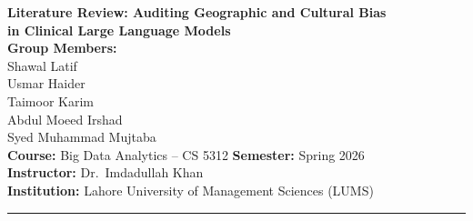 \documentclass[12pt,a4paper]{article}
\begin{document}
\begin{center}
{\LARGE \textbf{Literature Review: Auditing Geographic and Cultural Bias\\[0.4em]
in Clinical Large Language Models}}\\[1.8em]
{\large \textbf{Group Members:}}\\[0.6em]
Shawal Latif\\
Usmar Haider\\
Taimoor Karim\\
Abdul Moeed Irshad\\
Syed Muhammad Mujtaba\\[1.2em]
\textbf{Course:} Big Data Analytics -- CS 5312 \qquad
\textbf{Semester:} Spring 2026\\
\textbf{Instructor:} Dr.\ Imdadullah Khan\\
\textbf{Institution:} Lahore University of Management Sciences (LUMS)
\end{center}

\vspace{0.8em}\hrule\vspace{0.8em}

\begin{abstract}
This literature review surveys thirteen papers at the intersection of clinical artificial intelligence, algorithmic fairness, and large language model (LLM) evaluation, collectively motivating a systematic audit of geographic and cultural bias in clinical LLMs. The reviewed work is organised into four thematic categories: (1)~racial and sociodemographic bias in clinical AI systems; (2)~geographic and cultural bias in language models; (3)~clinical LLM evaluation frameworks and health equity benchmarks; and (4)~fairness methodologies, intersectionality, and perturbation-based auditing. The literature demonstrates that LLMs consistently produce disparate clinical recommendations driven by non-clinical identity cues---patient name, race, dialect, and geographic origin---even when the underlying medical presentation is held constant. Crucially, every reviewed clinical bias study operates within Global-North demographic categories; the Global North/South axis has never been evaluated as a systematic perturbation dimension. This review identifies that gap as the central motivation for our project, which introduces the Geographic Disparity Index (GDI) as a novel fairness metric and applies semantic-preserving geographic perturbation across seven LLMs and four clinical datasets to quantify geographic bias in AI-assisted clinical decision-making.
\end{abstract}
\end{document}
